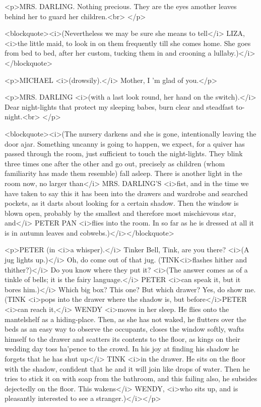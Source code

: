 <p>MRS. DARLING. Nothing precious. They are the eyes amother leaves
behind her to guard her children.<br>
</p>

<blockquote><i>(Nevertheless we may be sure she means to tell</i>
LIZA, <i>the little maid, to look in on them frequently till she
comes home. She goes from bed to bed, after her custom, tucking them
in and crooning a lullaby.)</i></blockquote>

<p>MICHAEL <i>(drowsily).</i> Mother, I 'm glad of you.</p>

<p>MRS. DARLING <i>(with a last look round, her hand on the
switch).</i> Dear night-lights that protect my sleeping babes, burn
clear and steadfast to-night.<br>
</p>

<blockquote><i>(The nursery darkens and she is gone, intentionally
leaving the door ajar. Something uncanny is going to happen, we
expect, for a quiver has passed through the room, just sufficient to
touch the night-lights. They blink three times one after the other
and go out, precisely as children (whom familiarity has made them
resemble) fall asleep. There is another light in the room now, no
larger than</i> MRS. DARLING'S <i>fist, and in the time we have taken
to say this it has been into the drawers and wardrobe and searched
pockets, as it darts about looking for a certain shadow. Then the
window is blown open, probably by the smallest and therefore most
mischievous star, and</i> PETER PAN <i>flies into the room. In so far
as he is dressed at all it is in autumn leaves and
cobwebs.)</i></blockquote>

<p>PETER (in <i>a whisper).</i> Tinker Bell, Tink, are you there?
<i>(A jug lights up.)</i> Oh, do come out of that jug.
(TINK<i>flashes hither and thither?)</i> Do you know where they put
it? <i>(The answer comes as of a tinkle of bells; it is the fairy
language.</i> PETER <i>can speak it, but it bores him.)</i> Which big
box? This one? But which drawer? Yes, do show me. (TINK <i>pops into
the drawer where the shadow is, but before</i>PETER <i>can reach
it,</i> WENDY <i>moves in her sleep. He flies onto the mantelshelf as
a hiding-place. Then, as she has not waked, he flutters over the beds
as an easy way to observe the occupants, closes the window softly,
wafts himself to the drawer and scatters its contents to the floor,
as kings on their wedding day toss ha'pence to the crowd. In his joy
at finding his shadow he forgets that he has shut up</i> TINK <i>in
the drawer. He sits on the floor with the shadow, confident that he
and it will join like drops of water. Then he tries to stick it on
with soap from the bathroom, and this failing also, he subsides
dejectedly on the floor. This wakens</i> WENDY, <i>who sits up, and
is pleasantly interested to see a stranger.)</i></p>

